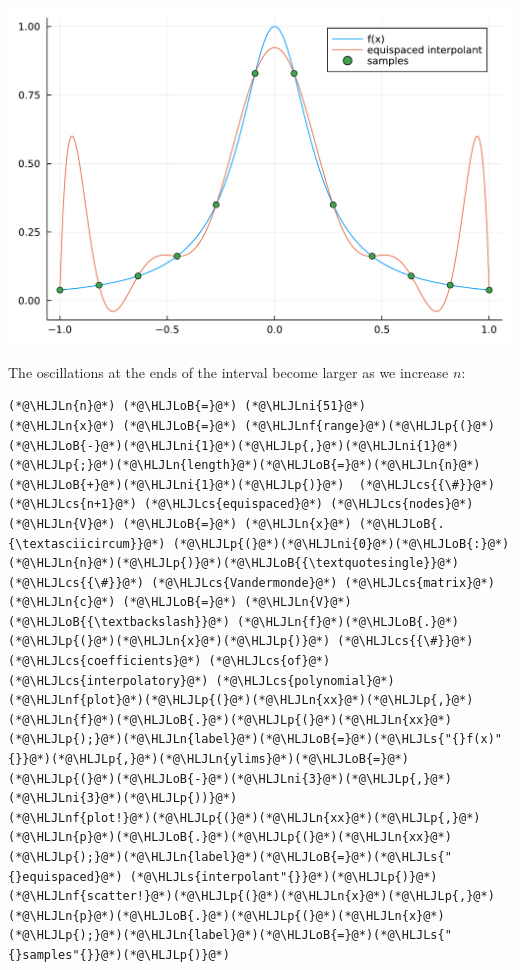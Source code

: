 \documentclass[12pt,a4paper]{article}
\newcommand{\HLJLn}[1]{#1}
\newcommand{\HLJLnf}[1]{\textcolor[RGB]{66,102,213}{#1}}
\newcommand{\HLJLs}[1]{\textcolor[RGB]{201,61,57}{#1}}
\newcommand{\HLJLni}[1]{\textcolor[RGB]{59,151,46}{#1}}
\newcommand{\HLJLoB}[1]{\textcolor[RGB]{102,102,102}{\textbf{#1}}}
\newcommand{\HLJLp}[1]{#1}
\newcommand{\HLJLcs}[1]{\textcolor[RGB]{153,153,119}{\textit{#1}}}
\begin{document}
\includegraphics[width=\linewidth]{jl_P71Faz/Chapter3_1_1.pdf}

The oscillations at the ends of the interval become larger as we increase $n$:


\begin{lstlisting}
(*@\HLJLn{n}@*) (*@\HLJLoB{=}@*) (*@\HLJLni{51}@*)
(*@\HLJLn{x}@*) (*@\HLJLoB{=}@*) (*@\HLJLnf{range}@*)(*@\HLJLp{(}@*)(*@\HLJLoB{-}@*)(*@\HLJLni{1}@*)(*@\HLJLp{,}@*)(*@\HLJLni{1}@*)(*@\HLJLp{;}@*)(*@\HLJLn{length}@*)(*@\HLJLoB{=}@*)(*@\HLJLn{n}@*)(*@\HLJLoB{+}@*)(*@\HLJLni{1}@*)(*@\HLJLp{)}@*)  (*@\HLJLcs{{\#}}@*) (*@\HLJLcs{n+1}@*) (*@\HLJLcs{equispaced}@*) (*@\HLJLcs{nodes}@*)  
(*@\HLJLn{V}@*) (*@\HLJLoB{=}@*) (*@\HLJLn{x}@*) (*@\HLJLoB{.{\textasciicircum}}@*) (*@\HLJLp{(}@*)(*@\HLJLni{0}@*)(*@\HLJLoB{:}@*)(*@\HLJLn{n}@*)(*@\HLJLp{)}@*)(*@\HLJLoB{{\textquotesingle}}@*) (*@\HLJLcs{{\#}}@*) (*@\HLJLcs{Vandermonde}@*) (*@\HLJLcs{matrix}@*)
(*@\HLJLn{c}@*) (*@\HLJLoB{=}@*) (*@\HLJLn{V}@*) (*@\HLJLoB{{\textbackslash}}@*) (*@\HLJLn{f}@*)(*@\HLJLoB{.}@*)(*@\HLJLp{(}@*)(*@\HLJLn{x}@*)(*@\HLJLp{)}@*) (*@\HLJLcs{{\#}}@*) (*@\HLJLcs{coefficients}@*) (*@\HLJLcs{of}@*) (*@\HLJLcs{interpolatory}@*) (*@\HLJLcs{polynomial}@*)
(*@\HLJLnf{plot}@*)(*@\HLJLp{(}@*)(*@\HLJLn{xx}@*)(*@\HLJLp{,}@*)(*@\HLJLn{f}@*)(*@\HLJLoB{.}@*)(*@\HLJLp{(}@*)(*@\HLJLn{xx}@*)(*@\HLJLp{);}@*)(*@\HLJLn{label}@*)(*@\HLJLoB{=}@*)(*@\HLJLs{"{}f(x)"{}}@*)(*@\HLJLp{,}@*)(*@\HLJLn{ylims}@*)(*@\HLJLoB{=}@*)(*@\HLJLp{(}@*)(*@\HLJLoB{-}@*)(*@\HLJLni{3}@*)(*@\HLJLp{,}@*)(*@\HLJLni{3}@*)(*@\HLJLp{))}@*)
(*@\HLJLnf{plot!}@*)(*@\HLJLp{(}@*)(*@\HLJLn{xx}@*)(*@\HLJLp{,}@*)(*@\HLJLn{p}@*)(*@\HLJLoB{.}@*)(*@\HLJLp{(}@*)(*@\HLJLn{xx}@*)(*@\HLJLp{);}@*)(*@\HLJLn{label}@*)(*@\HLJLoB{=}@*)(*@\HLJLs{"{}equispaced}@*) (*@\HLJLs{interpolant"{}}@*)(*@\HLJLp{)}@*)
(*@\HLJLnf{scatter!}@*)(*@\HLJLp{(}@*)(*@\HLJLn{x}@*)(*@\HLJLp{,}@*)(*@\HLJLn{p}@*)(*@\HLJLoB{.}@*)(*@\HLJLp{(}@*)(*@\HLJLn{x}@*)(*@\HLJLp{);}@*)(*@\HLJLn{label}@*)(*@\HLJLoB{=}@*)(*@\HLJLs{"{}samples"{}}@*)(*@\HLJLp{)}@*)
\end{lstlisting}
\end{document}

